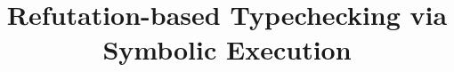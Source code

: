 \documentclass[format=acmsmall, review=false, screen=true]{acmfart} %
\begin{document}
\title[Reinterpret Types]{Refutation-based Typechecking via Symbolic Execution}

\maketitle
 



% 


% 
% 

%
\end{document}
